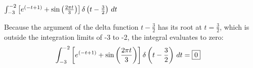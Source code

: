 \documentclass[a4paper, 10pt]{article}
\begin{document}
\begin{tosubmit}
\begin{subproblems}[start=3]
    \item \( \int_{-3}^{-2} \left[ e^{(-t+1)} + \sin \left( \frac{2\pi t}{3} \right) \right] \delta \left(t- \frac{3}{2} \right) \,dt \)
\end{subproblems}

\par\noindent\submitsolution
Because the argument of the delta function \( t - \frac{3}{2} \) has its root at \( t = \frac{3}{2} \), which is outside the integration limits of -3 to -2, the integral evaluates to zero:
\begin{align*}
    \int_{-3}^{-2} \left[ e^{(-t+1)} + \sin \left( \frac{2\pi t}{3} \right) \right] \delta \left(t- \frac{3}{2} \right) \,dt &= \boxed{0}
\end{align*}
\end{tosubmit}
\end{document}
